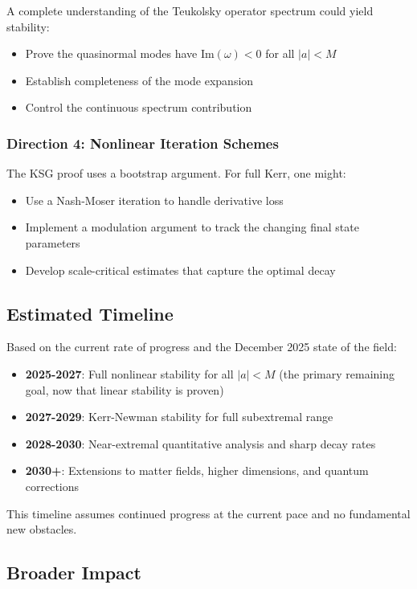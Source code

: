 \documentclass[12pt,a4paper]{article}
\begin{document}
A complete understanding of the Teukolsky operator spectrum could yield stability:
\begin{itemize}
    \item Prove the quasinormal modes have $\text{Im}(\omega) < 0$ for all $|a| < M$
    \item Establish completeness of the mode expansion
    \item Control the continuous spectrum contribution
\end{itemize}

\subsubsection{Direction 4: Nonlinear Iteration Schemes}

The KSG proof uses a bootstrap argument. For full Kerr, one might:
\begin{itemize}
    \item Use a Nash-Moser iteration to handle derivative loss
    \item Implement a modulation argument to track the changing final state parameters
    \item Develop scale-critical estimates that capture the optimal decay
\end{itemize}

\subsection{Estimated Timeline}

Based on the current rate of progress and the December 2025 state of the field:
\begin{itemize}
    \item \textbf{2025-2027}: Full nonlinear stability for all $|a| < M$ (the primary remaining goal, now that linear stability is proven)
    \item \textbf{2027-2029}: Kerr-Newman stability for full subextremal range
    \item \textbf{2028-2030}: Near-extremal quantitative analysis and sharp decay rates
    \item \textbf{2030+}: Extensions to matter fields, higher dimensions, and quantum corrections
\end{itemize}

This timeline assumes continued progress at the current pace and no fundamental new obstacles.

\subsection{Broader Impact}
\end{document}
